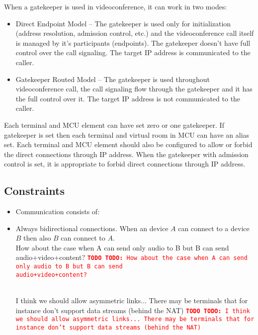 \documentclass[a4paper]{report}
\newcommand{\TODO}[1]{%
\def\empty{}%
\def\prvniparametr{#1}%
\ifx\prvniparametr\empty%
\begingroup\tt\textcolor{red}{\noindent\textbf{TODO}}\endgroup
\else%
\begingroup\tt\textcolor{red}{\noindent\textbf{TODO:}\ #1}\endgroup
\fi%
}
\begin{document}
When a gatekeeper is used in videoconference, it can work in two modes:
\begin{itemize}
\item Direct Endpoint Model -- The gatekeeper is used only for initialization (address resolution, admission control, etc.) and the videoconference call itself is managed by it's participants (endpoints). The gatekeeper doesn't have full control over the call signaling. The target IP address is communicated to the caller.
\item Gatekeeper Routed Model -- The gatekeeper is used throughout videoconference call, the call signaling flow through the gatekeeper and it has the full control over it. The target IP address is not communicated to the caller.
\end{itemize}

Each terminal and MCU element can have set zero or one gatekeeper. If gatekeeper is set then each terminal and virtual room in MCU can have an alias set. Each terminal and MCU element should also be configured to allow or forbid the direct connections through IP address. When the gatekeeper with admission control is set, it is appropriate to forbid direct connections through IP address.

\subsection{Constraints}

\begin{itemize}

\item Communication consists of:

\item Always bidirectional connections. When an device $A$ can connect to a device $B$ then also $B$ can connect to $A$.
\\ \TODO{How about the case when A can send only audio to B but B can send \\ audio+video+content?}
\\ \TODO{I think we should allow asymmetric links... There may be terminals that for instance don't support data streams (behind the NAT)}

\end{itemize}
\end{document}
